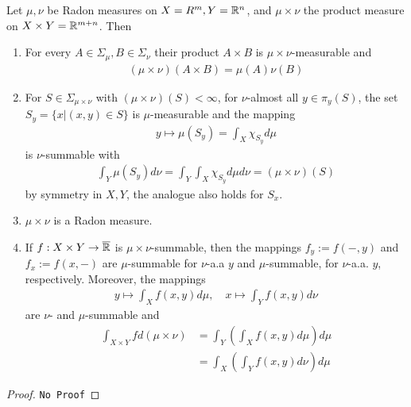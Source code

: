 \begin{thm}[Fubini]
  Let $\mu,\nu$ be Radon measures on $X = R^{m}, Y = \mathbb{R}^{n}$, and $\mu \times \nu$ the product measure on $X \times Y = \mathbb{R}^{m+n}$.
  Then
  \begin{enumerate}
    \item For every $A \in \Sigma_{\mu}, B \in \Sigma_{\nu}$ their product $A \times B$ is $\mu \times \nu$-measurable and
      \begin{align*}
        (\mu \times \nu)(A \times B) = \mu(A) \nu(B)
      \end{align*}
    \item For $S \in \Sigma_{\mu \times \nu}$ with $(\mu \times \nu)(S) < \infty$, for $\nu$-almost all $y \in \pi_y(S)$, the set
      $S_y = \{x \big\vert (x,y) \in S\}$ is 
      $\mu$-measurable and the mapping
      \begin{align*}
        y \mapsto  \mu(S_y) = \int_{X} \chi_{S_y} d \mu
      \end{align*}
      is $\nu$-summable with 
      \begin{align*}
        \int_{Y} \mu(S_y) d \nu = \int_{Y} \int_{X} \chi_{S_y} d \mu d \nu = (\mu \times \nu)(S)
      \end{align*}
      by symmetry in $X,Y$, the analogue also holds for $S_x$.

    \item $\mu \times \nu$ is a Radon measure.
    \item If $f: X \times Y \to \overline{\mathbb{R}}$ is $\mu \times \nu$-summable, then the mappings $f_y := f(-,y)$ and $f_x := f(x,-)$ are $\mu$-summable for $\nu$-a.a $y$ and $\mu$-summable, for $\nu$-a.a. $y$, respectively.
      Moreover, the mappings
      \begin{align*}
        y \mapsto  \int_X f(x,y) d \mu, \quad
        x \mapsto \int_Y f(x,y) d \nu
      \end{align*}
      are $\nu$- and $\mu$-summable and
      \begin{align*}
        \int_{X \times Y} f d(\mu \times \nu)
        &=
        \int_{Y} \left(
          \int_{X} f(x,y) d \mu 
        \right) d \mu
        \\
        &=
        \int_{X} \left(
          \int_{Y} f(x,y) d \nu 
        \right) d \mu
      \end{align*}  
  \end{enumerate}
\end{thm}

\begin{proof}
\texttt{No Proof}
\end{proof}
